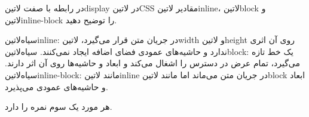 
در رابطه با صفت ‌لاتین{display} در ‌لاتین{CSS} مقادیر ‌لاتین{inline}، ‌لاتین{block} و ‌لاتین{inline-block} را توضیح دهید.


\begin{پاسخ}

 ‌سیاه{‌لاتین{inline}}: در جریان متن قرار می‌گیرد، ‌لاتین{width} و ‌لاتین{height} روی آن اثری ندارد و حاشیه‌های عمودی فضای اضافه ایجاد نمی‌کنند.
 ‌سیاه{‌لاتین{block}}: یک خط تازه می‌گیرد، تمام عرض در دسترس را اشغال می‌کند و ابعاد و حاشیه‌ها روی آن اثر دارند.
 ‌سیاه{‌لاتین{inline-block}}: مانند ‌لاتین{inline} در جریان متن می‌ماند اما مانند ‌لاتین{block} ابعاد و حاشیه‌های عمودی می‌پذیرد.

هر مورد یک سوم نمره را دارد.

\end{پاسخ}
